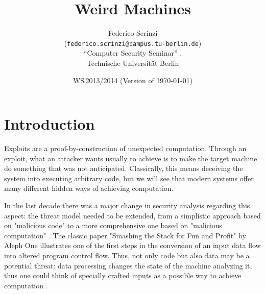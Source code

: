 \documentclass[11pt,twoside,a4paper]{article}
\begin{document}
\title{Weird Machines}
\author{Federico Scrinzi \\
  (\texttt{federico.scrinzi@campus.tu-berlin.de})\\[5mm]
  "`Computer Security Seminar"' , \\
  Technische Universität Berlin
}
  
\date{WS\,2013/2014 (Version of \today)}

\maketitle



\section{Introduction}
Exploits are a proof-by-construction of unexpected computation. Through an exploit, what an attacker wants usually to achieve is to make the target machine do something that was not anticipated. Classically, this means deceiving the system into executing arbitrary code, but we will see that modern systems offer many different hidden ways of achieving computation.

In the last decade there was a major change in security analysis regarding this aspect: the threat model needed to be extended, from a simplistic approach based on "malicious code" to a more comprehensive one based on "malicious computation" \cite{hund}. 
The classic paper "Smashing the Stack for Fun and Profit" by Aleph One \cite{smashing} illustrates one of the first steps in the conversion of an input data flow into altered program control flow. Thus, not only code but also data may be a potential threat: data processing changes the state of the machine analyzing it, thus one could think of specially crafted inputs as a possible way to achieve computation \cite{noncontroldata}.
\end{document}
